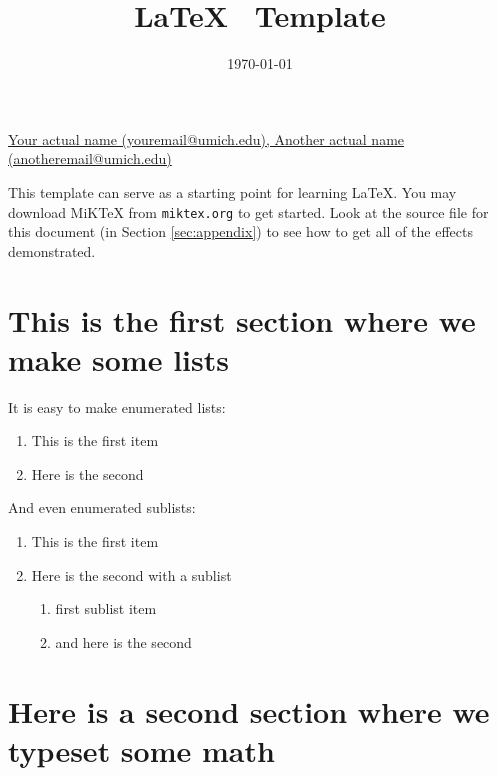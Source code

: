 \documentclass{amsart}
\theoremstyle{definition}
\theoremstyle{remark}
\numberwithin{equation}{section}
\begin{document}
\title{\LaTeX~ Template}

\date{\today}

\maketitle

 \href{mailto:youremail@umich.edu,anotheremail@umich.edu}
{Your actual name (youremail@umich.edu),
Another actual name (anotheremail@umich.edu)}

%
%

\bigskip


This template can serve as a starting point for learning \LaTeX. You may download MiKTeX from
{\tt miktex.org}
to get started. Look at the source file for this
document (in Section \ref{sec:appendix})
to see how to get all of the effects demonstrated.

\section{This is the first section where we make some lists}

It is easy to make enumerated lists:
\begin{enumerate}
\item This is the first item
\item Here is the second
\end{enumerate}

And even enumerated sublists:
\begin{enumerate}
\item This is the first item
\item Here is the second with a sublist
\begin{enumerate}
\item first sublist item
\item and here is the second
\end{enumerate}
\end{enumerate}

\section{Here is a second section where we typeset some math}
\end{document}
